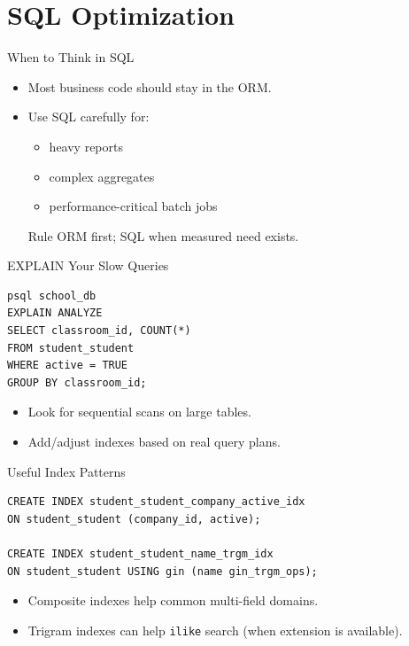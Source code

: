 \section{SQL Optimization}

\begin{frame}[fragile]{When to Think in SQL}
	\begin{itemize}
		\item Most business code should stay in the ORM.
		\item Use SQL carefully for:
		\begin{itemize}
			\item heavy reports
			\item complex aggregates
			\item performance-critical batch jobs
		\end{itemize}
\begin{block}{Rule}
	ORM first; SQL when measured need exists.
\end{block}
	\end{itemize}
\end{frame}

\begin{frame}[fragile]{EXPLAIN Your Slow Queries}
\begin{lstlisting}[style=bash]
psql school_db
EXPLAIN ANALYZE
SELECT classroom_id, COUNT(*)
FROM student_student
WHERE active = TRUE
GROUP BY classroom_id;
\end{lstlisting}
	\begin{itemize}
		\item Look for sequential scans on large tables.
		\item Add/adjust indexes based on real query plans.
	\end{itemize}
\end{frame}

\begin{frame}[fragile]{Useful Index Patterns}
\begin{lstlisting}[style=bash]
CREATE INDEX student_student_company_active_idx
ON student_student (company_id, active);

CREATE INDEX student_student_name_trgm_idx
ON student_student USING gin (name gin_trgm_ops);
\end{lstlisting}
	\begin{itemize}
		\item Composite indexes help common multi-field domains.
		\item Trigram indexes can help \texttt{ilike} search (when extension is available).
	\end{itemize}
\end{frame}

